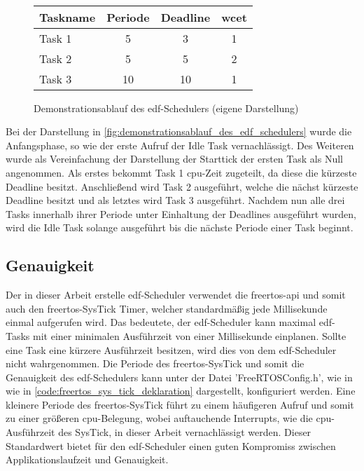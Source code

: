 \documentclass[../EDF Master Thesis.tex]{subfiles}
\begin{document}
\begin{figure}[ht!]
\\
        \vspace {1cm}
        \begin{tabular}{l|c|c|c}
            Taskname & Periode & Deadline & \ac{wcet} \\
            \hline
            Task 1 & 5 & 3 & 1 \\
            Task 2 & 5 & 5 & 2 \\
            Task 3 & 10 & 10 & 1 
        \end{tabular}
        \caption[Demonstrationsablauf des \ac{edf}-Schedulers]{Demonstrationsablauf des \ac{edf}-Schedulers (eigene Darstellung)}
        \label{fig:demonstrationsablauf_des_edf_schedulers}
    \end{figure}

    Bei der Darstellung in \autoref{fig:demonstrationsablauf_des_edf_schedulers} wurde die Anfangsphase, so wie der erste Aufruf der Idle Task vernachlässigt.
    Des Weiteren wurde als Vereinfachung der Darstellung der Starttick der ersten Task als Null angenommen.
    Als erstes bekommt Task 1 \ac{cpu}-Zeit zugeteilt, da diese die kürzeste Deadline besitzt.
    Anschließend wird Task 2 ausgeführt, welche die nächst kürzeste Deadline besitzt und als letztes wird Task 3 ausgeführt.
    Nachdem nun alle drei Tasks innerhalb ihrer Periode unter Einhaltung der Deadlines ausgeführt wurden, wird die Idle Task solange ausgeführt bis die nächste Periode einer Task beginnt.

\subsection{Genauigkeit} \label{section:genauigkeit}

Der in dieser Arbeit erstelle \ac{edf}-Scheduler verwendet die \ac{freertos}-\ac{api} und somit auch den \ac{freertos}-SysTick Timer, welcher standardmäßig jede Millisekunde einmal aufgerufen wird.
Das bedeutete, der \ac{edf}-Scheduler kann maximal \ac{edf}-Tasks mit einer minimalen Ausführzeit von einer Millisekunde einplanen.
Sollte eine Task eine kürzere Ausführzeit besitzen, wird dies von dem \ac{edf}-Scheduler nicht wahrgenommen.
Die Periode des \ac{freertos}-SysTick und somit die Genauigkeit des \ac{edf}-Schedulers kann unter der Datei 'FreeRTOSConfig.h', wie in wie in \autoref{code:freertos_sys_tick_deklaration} dargestellt, konfiguriert werden.
Eine kleinere Periode des \ac{freertos}-SysTick führt zu einem häufigeren Aufruf und somit zu einer größeren \ac{cpu}-Belegung, wobei auftauchende Interrupts, wie die \ac{cpu}-Ausführzeit des SysTick, in dieser Arbeit vernachlässigt werden.
Dieser Standardwert bietet für den \ac{edf}-Scheduler einen guten Kompromiss zwischen Applikationslaufzeit und Genauigkeit.
\end{document}
